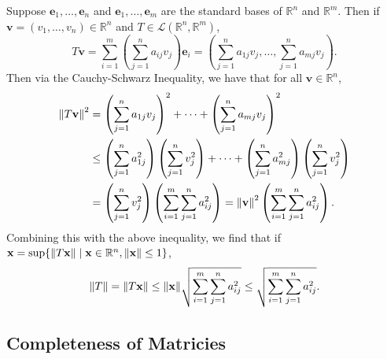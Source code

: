 \documentclass[11pt]{article}
\renewcommand{\vec}[1]{\mathbf{#1}}
\begin{document}
Suppose $\vec{e}_{1}, \ldots, \vec{e}_{n}$ and $\vec{e}_{1}, \ldots, \vec{e}_{m}$ are the standard bases of $\mathbb{R}^{n}$ and $\mathbb{R}^{m}$. Then if $\vec{v} = (v_{1}, \ldots, v_{n}) \in \mathbb{R}^{n}$ and $T \in \mathcal{L}(\mathbb{R}^{n}, \mathbb{R}^{m})$,
\[
	T \vec{v} = \sum_{i = 1}^{m} \left( \sum_{j = 1}^{n} a_{ij} v_{j} \right) \vec{e}_{i} = \left( \sum_{j = 1}^{n} a_{1j} v_{j}, \ldots, \sum_{j = 1}^{n} a_{mj} v_{j} \right).
\]
Then via the Cauchy-Schwarz Inequality, we have that for all $\vec{v} \in \mathbb{R}^{n}$,
\begin{align*}
	\norm{T \vec{v}}^{2} &= \left( \sum_{j = 1}^{n} a_{1j} v_{j} \right)^{2} + \cdots + \left( \sum_{j = 1}^{n} a_{mj} v_{j} \right)^{2} \\
	& \le \left( \sum_{j = 1}^{n} a_{1j}^{2} \right) \left( \sum_{j = 1}^{n} v_{j}^{2} \right) + \cdots + \left( \sum_{j = 1}^{n} a_{mj}^{2} \right) \left( \sum_{j = 1}^{n} v_{j}^{2} \right) \\
	&= \left( \sum_{j = 1}^{n} v_{j}^{2} \right) \left( \sum_{i = 1}^{m} \sum_{j = 1}^{n} a_{ij}^{2} \right) = \norm{\vec{v}}^{2} \left( \sum_{i = 1}^{m} \sum_{j = 1}^{n} a_{ij}^{2} \right).
\end{align*}
Combining this with the above inequality, we find that if $\vec{x} = \sup \{ \norm{T \vec{x}} \mid \vec{x} \in \mathbb{R}^{n}, \norm{\vec{x}} \le 1 \}$,
\[
	\norm{T} = \norm{T  \vec{x}} \le \norm{\vec{x}} \sqrt{\sum_{i = 1}^{m} \sum_{j = 1}^{n} a_{ij}^{2}} \le \sqrt{\sum_{i = 1}^{m} \sum_{j = 1}^{n} a_{ij}^{2}}.
\]
\subsection{Completeness of Matricies}
\end{document}
